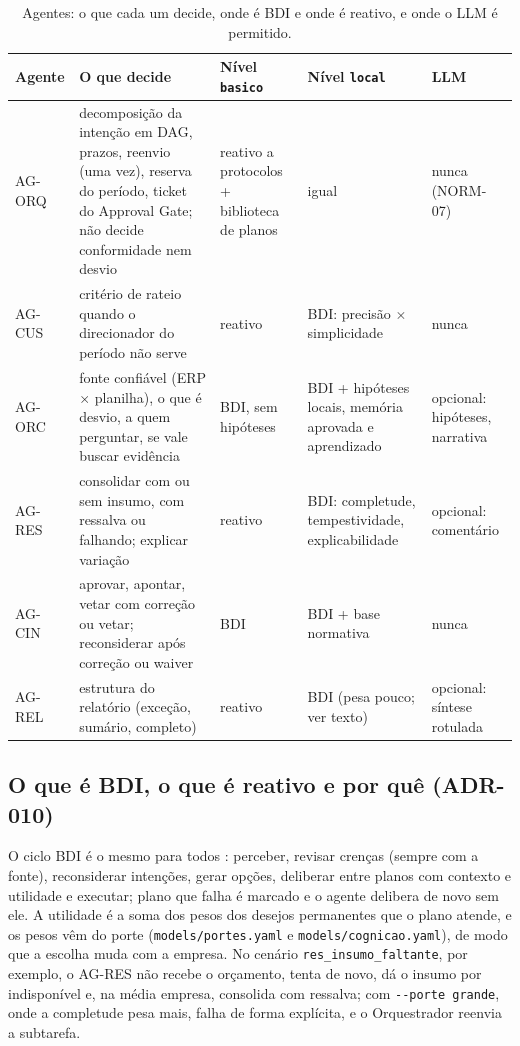 \documentclass[10pt,a4paper]{article}
\newcommand{\code}[1]{\texttt{#1}}
\newenvironment{tabela}[1]{\begin{table}[H]\centering\footnotesize\renewcommand{\arraystretch}{1.1}\caption{#1}}{\end{table}}
\begin{document}
\begin{tabela}{Agentes: o que cada um decide, onde é BDI e onde é reativo, e onde o LLM é permitido.\label{tab:agentes}}
\begin{tabularx}{\linewidth}{L{1.4cm} Y L{2.6cm} L{3.4cm} L{2.0cm}}
\toprule
\textbf{Agente} & \textbf{O que decide} & \textbf{Nível \code{basico}} & \textbf{Nível \code{local}} & \textbf{LLM}\\ \midrule
AG-ORQ & decomposição da intenção em DAG, prazos, reenvio (uma vez), reserva do período, ticket do Approval Gate; não decide conformidade nem desvio & reativo a protocolos + biblioteca de planos & igual & nunca (NORM-07) \\
AG-CUS & critério de rateio quando o direcionador do período não serve & reativo & BDI: precisão $\times$ simplicidade & nunca \\
AG-ORC & fonte confiável (ERP $\times$ planilha), o que é desvio, a quem perguntar, se vale buscar evidência & BDI, sem hipóteses & BDI + hipóteses locais, memória aprovada e aprendizado & opcional: hipóteses, narrativa \\
AG-RES & consolidar com ou sem insumo, com ressalva ou falhando; explicar variação & reativo & BDI: completude, tempestividade, explicabilidade & opcional: comentário \\
AG-CIN & aprovar, apontar, vetar com correção ou vetar; reconsiderar após correção ou waiver & BDI & BDI + base normativa & nunca \\
AG-REL & estrutura do relatório (exceção, sumário, completo) & reativo & BDI (pesa pouco; ver texto) & opcional: síntese rotulada \\
\bottomrule
\end{tabularx}
\end{tabela}

\subsection{O que é BDI, o que é reativo e por quê (ADR-010)}
O ciclo BDI é o mesmo para todos \parencite{rao1995,bratman1987}: perceber, revisar crenças (sempre com a fonte),
reconsiderar intenções, gerar opções, deliberar entre planos com contexto e utilidade e executar; plano que falha é
marcado e o agente delibera de novo sem ele. A utilidade é a soma dos pesos dos desejos permanentes que o plano atende,
e os pesos vêm do porte (\code{models/portes.yaml} e \code{models/cognicao.yaml}), de modo que a escolha muda com a
empresa. No cenário \code{res\_insumo\_faltante}, por exemplo, o AG-RES não recebe o orçamento, tenta de novo, dá o
insumo por indisponível e, na média empresa, consolida com ressalva; com \code{-{}-porte grande}, onde a completude pesa
mais, falha de forma explícita, e o Orquestrador reenvia a subtarefa.
\end{document}
